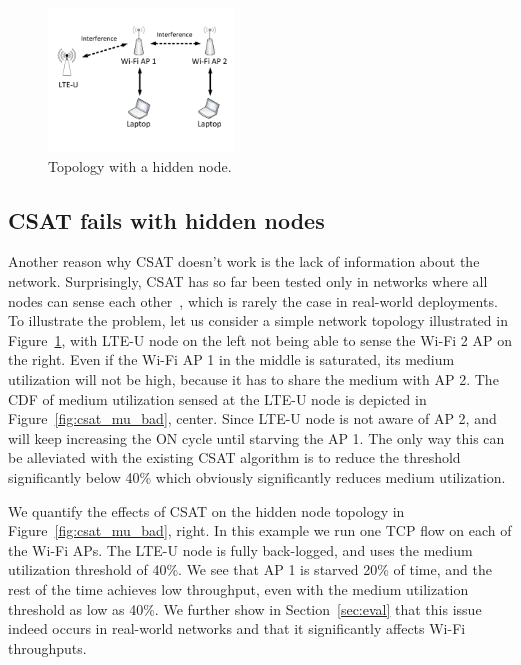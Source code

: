 


\begin{figure}[htb!]
\vspace{-12pt}
 \centering
    \includegraphics[width=0.44\textwidth]{./figures/topology.pdf}
\vspace{-24pt}
 \caption{Topology with a hidden node.}
  \label{fig:csat_hidden}
\vspace{-12pt}
\end{figure}



\subsection{CSAT fails with hidden nodes}

Another reason why CSAT doesn't work is the lack of information about the network. 
Surprisingly, CSAT has so far been tested only in networks where all nodes can sense each other~\cite{qualcommpresentation, google, cablelabs}, which is rarely the case in real-world deployments. 
To illustrate the problem, let us consider a simple network topology illustrated in Figure~\ref{fig:csat_hidden}, with LTE-U node on the left not being able to sense the Wi-Fi 2 AP on the right. 
Even if the Wi-Fi AP 1 in the middle is saturated, its medium utilization will not be high, because it has to share the medium with AP 2. 
The CDF of medium utilization sensed at the LTE-U node is depicted in Figure~\ref{fig:csat_mu_bad}, center. 
Since LTE-U node is not aware of AP 2, and will keep increasing the ON cycle until starving the AP 1. 
The only way this can be alleviated with the existing CSAT algorithm is to reduce the threshold significantly below 40\% which obviously significantly reduces medium utilization.
 
We quantify the effects of CSAT on the hidden node topology in Figure~\ref{fig:csat_mu_bad}, right. In this example we run one TCP flow on each of the Wi-Fi APs. The LTE-U node is fully back-logged, and uses the medium utilization threshold of 40\%. We see that AP 1 is starved 20\% of time, and the rest of the time achieves low throughput, even with the medium utilization threshold as low as 40\%. We further show in Section~\ref{sec:eval} that this issue indeed occurs in real-world networks and that it significantly affects Wi-Fi throughputs. 






